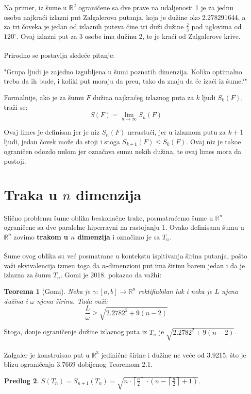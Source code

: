 \documentclass[11pt,letter]{article}
\newtheorem{teo}{\bf Teorema}[section]
\newtheorem{pred}[teo]{\bf Predlog}
\begin{document}
\indent Na primer, iz \v sume u $\mathbb{R}^2$ ograni\v cene sa dve prave na udaljenosti 1 je za jednu osobu najkra\' ci izlazni put Zalgalerova putanja, koja je du\v zine oko 2.278291644, a za tri \v coveka je jedan od izlaznih puteva \v cine tri du\v zi du\v zine $\frac{2}{3}$ pod uglovima od $120^\circ$. Ovaj izlazni put za 3 osobe ima du\v zinu 2, te je kra\' ci od Zalgalerove krive.
\\
\smallskip
\\
\indent Prirodno se postavlja slede\' ce pitanje:
\begin{center}
"Grupa ljudi je zajedno izgubljena u \v sumi poznatih dimenzija. Koliko optimalno treba da ih bude, i koliki put moraju da pre\dj u, tako da znaju da \' ce iza\' ci iz \v sume?"
\end{center}
Formalnije, ako je za \v sumu $F$ du\v zina najkra\' ceg izlaznog puta za $k$ ljudi $S_k(F)$, tra\v zi se:
$$S(F)=\lim_{n \to \infty} S_n(F)$$

\indent Ovaj limes je definisan jer je niz $S_n(F)$ nerastu\' ci, jer u izlaznom putu za $k+1$ ljudi, jedan \v covek mo\v ze da stoji i stoga $S_{k+1}(F)\leqslant S_{k}(F)$. Ovaj niz je tako\dj e ograni\v cen odozdo nulom jer ozna\v cava sumu nekih du\v zina, te ovaj limes mora da postoji. 
\\
\section[Traka u $n$ dimenzija]{Traka u $n$ dimenzija}
\bigskip
 Sli\v cno problemu \v sume oblika beskona\v cne trake, posmatra\' cemo \v sume u $\mathbb{R}^n$ ograni\v cene sa dve paralelne hiperravni na rastojanju 1. Ovako definisanu \v sumu u $\mathbb{R}^n$ zovimo \textbf{trakom u $n$ dimenzija} i ozna\v cimo je sa $T_n$.
\\
\\
\indent \v Sume ovog oblika su ve\' c posmatrane u kontekstu ispitivanja \v sirina putanja, po\v sto va\v zi ekvivalencija izme\dj u toga da $n$-dimenzioni put ima \v sirinu barem jedan i da je izlazna za \v sumu $T_n$. Gomi je 2018. pokazao da va\v zhi:
\smallskip
\begin{teo}[Gomi] 
Neka je $\gamma: [a,b]\to \mathbb{R}^n$ rektifiabilan luk i neka je $L$ njena du\v zina i $\omega$ njena \v sirina. Tada va\v zi:
$$\frac{L}{\omega}\geqslant \sqrt{2.2782^2+9(n-2)}$$
\end{teo}
\bigskip

\indent Stoga, donje ograni\v cenje du\v zine izlaznog puta iz $T_n$ je $ \sqrt{2.2782^2+9(n-2)}$.
\\
\\
Zalgaler je konstruisao put u $\mathbb{R}^3$ jedini\v cne \v sirine i du\v zine ne ve\' ce od 3.9215, \v sto je blizu ograni\v cenja 3.7669 dobijenog Teoremom 2.1.
\\
\begin{pred} $S(T_n)=S_{n+1}(T_n)=\sqrt{n\cdot\left\lceil\frac{n}{2}\right\rceil\cdot\left( n-\left\lceil\frac{n}{2}\right\rceil+1\right)}$.\end{pred}
\smallskip
\end{document}
